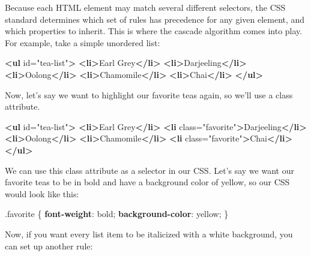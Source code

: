 \documentclass[12pt,]{krantz}
\makeatletter
\newenvironment{Shaded}{\begin{snugshade}}{\end{snugshade}}
\newcommand{\DecValTok}[1]{\textcolor[rgb]{0.00,0.00,0.81}{#1}}
\newcommand{\FunctionTok}[1]{\textcolor[rgb]{0.00,0.00,0.00}{#1}}
\newcommand{\KeywordTok}[1]{\textcolor[rgb]{0.13,0.29,0.53}{\textbf{#1}}}
\newcommand{\NormalTok}[1]{#1}
\newcommand{\OtherTok}[1]{\textcolor[rgb]{0.56,0.35,0.01}{#1}}
\newcommand{\StringTok}[1]{\textcolor[rgb]{0.31,0.60,0.02}{#1}}
\newenvironment{kframe}{%
\medskip{}
\setlength{\fboxsep}{.8em}
 \def\at@end@of@kframe{}%
 \ifinner\ifhmode%
  \def\at@end@of@kframe{\end{minipage}}%
  \begin{minipage}{\columnwidth}%
 \fi\fi%
 \def\FrameCommand##1{\hskip\@totalleftmargin \hskip-\fboxsep
 \colorbox{shadecolor}{##1}\hskip-\fboxsep
     \hskip-\linewidth \hskip-\@totalleftmargin \hskip\columnwidth}%
 \MakeFramed {\advance\hsize-\width
   \@totalleftmargin\z@ \linewidth\hsize
   \@setminipage}}%
 {\par\unskip\endMakeFramed%
 \at@end@of@kframe}
\renewenvironment{Shaded}{\begin{kframe}}{\end{kframe}}
\theoremstyle{definition}
\theoremstyle{definition}
\theoremstyle{definition}
\theoremstyle{remark}
\makeatother
\begin{document}
Because each HTML element may match several different selectors, the CSS
standard determines which set of rules has precedence for any given
element, and which properties to inherit. This is where the cascade
algorithm comes into play. For example, take a simple unordered list:

\begin{Shaded}
\begin{Highlighting}[]
\KeywordTok{<ul}\OtherTok{ id=}\StringTok{"tea-list"}\KeywordTok{>}
  \KeywordTok{<li>}\NormalTok{Earl Grey}\KeywordTok{</li>}
  \KeywordTok{<li>}\NormalTok{Darjeeling}\KeywordTok{</li>}
  \KeywordTok{<li>}\NormalTok{Oolong}\KeywordTok{</li>}
  \KeywordTok{<li>}\NormalTok{Chamomile}\KeywordTok{</li>}
  \KeywordTok{<li>}\NormalTok{Chai}\KeywordTok{</li>}
\KeywordTok{</ul>}
\end{Highlighting}
\end{Shaded}

Now, let's say we want to highlight our favorite teas again, so we'll
use a class attribute.

\begin{Shaded}
\begin{Highlighting}[]
\KeywordTok{<ul}\OtherTok{ id=}\StringTok{"tea-list"}\KeywordTok{>}
  \KeywordTok{<li>}\NormalTok{Earl Grey}\KeywordTok{</li>}
  \KeywordTok{<li}\OtherTok{ class=}\StringTok{"favorite"}\KeywordTok{>}\NormalTok{Darjeeling}\KeywordTok{</li>}
  \KeywordTok{<li>}\NormalTok{Oolong}\KeywordTok{</li>}
  \KeywordTok{<li>}\NormalTok{Chamomile}\KeywordTok{</li>}
  \KeywordTok{<li}\OtherTok{ class=}\StringTok{"favorite"}\KeywordTok{>}\NormalTok{Chai}\KeywordTok{</li>}
\KeywordTok{</ul>}
\end{Highlighting}
\end{Shaded}

We can use this class attribute as a selector in our CSS. Let's say we
want our favorite teas to be in bold and have a background color of
yellow, so our CSS would look like this:

\begin{Shaded}
\begin{Highlighting}[]
\FunctionTok{.favorite}\NormalTok{ \{}
  \KeywordTok{font-weight}\NormalTok{: }\DecValTok{bold}\NormalTok{;}
  \KeywordTok{background-color}\NormalTok{: }\DecValTok{yellow}\NormalTok{;}
\NormalTok{\}}
\end{Highlighting}
\end{Shaded}

Now, if you want every list item to be italicized with a white
background, you can set up another rule:
\end{document}
